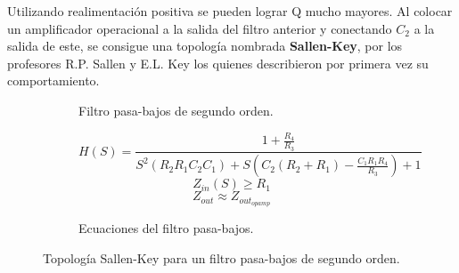 Utilizando realimentación positiva se pueden lograr Q mucho mayores. Al colocar un amplificador operacional a la salida del filtro anterior y conectando $C_2$ a la salida de este, se consigue una topología nombrada \textbf{Sallen-Key}, por los profesores R.P. Sallen y E.L. Key los quienes describieron por primera vez su comportamiento.

\begin{figure}[H]

	\begin{subfigure}[t]{0.49\textwidth}

		\centering
	\caption{Filtro pasa-bajos de segundo orden.}
	\label{fig:sallenkey}
	\end{subfigure}
	\begin{subfigure}{0.49\textwidth}
		\vspace{-4cm}
		\begin{equation*}
			H(S) = \frac{1+ \frac{R_4}{R_3}}{S^2 (R_2 R_1 C_2 C_1) + S(C_2 (R_2 + R_1) - \frac{C_1 R_1 R_4}{R_3}) + 1} 
		\end{equation*}				
		\begin{equation*}
			Z_{in}(S) \geq R_1
		\end{equation*}
		\begin{equation*}
		Z_{out}\approx Z_{out_{opamp}}
		\end{equation*}
	\caption{Ecuaciones del filtro pasa-bajos.}
	\end{subfigure}
	\caption{Topología Sallen-Key para un filtro pasa-bajos de segundo orden.}
\end{figure}

